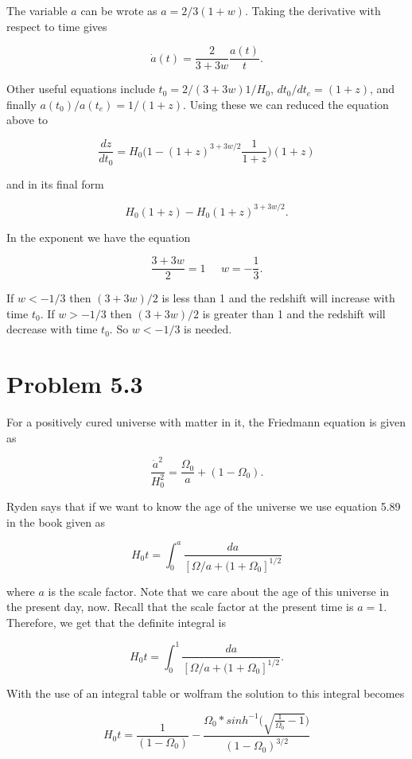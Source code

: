 \documentclass[12pt]{article}
\begin{document}
The variable $a$ can be wrote as $a = 2/3(1 + w)$. Taking the derivative with respect to time gives 

$$
\dot{a}(t) = \frac{2}{3 + 3w}\frac{a(t)}{t}.
$$

Other useful equations include $t_{0} = 2/(3 + 3w)1/H_{0}$, $dt_{0}/dt_{e} = (1 + z)$, and finally $a(t_{0})/a(t_{e}) = 1/(1 + z)$. Using these we can reduced the equation above to 

$$
\frac{dz}{dt_{0}} = H_{0}\Big(1 - (1+z)^{3+3w/2}\frac{1}{1+z}\Big)(1+z)
$$

and in its final form

$$
H_{0}(1+z) - H_{0}(1+z)^{3+3w/2}.
$$

In the exponent we have the equation 

$$
\frac{3 + 3w}{2} = 1 \; \; \; \; \;  w = -\frac{1}{3}.
$$

If $w < -1/3$ then $ (3 + 3w)/2$ is less than 1 and the redshift will increase with time $t_{0}$. If $w > -1/3$ then $ (3 + 3w)/2$ is greater than 1 and the redshift will decrease with time $t_{0}$. So $w < -1/3$ is needed.

\section*{Problem 5.3}

For a positively cured universe with matter in it, the Friedmann equation is given as

$$
\frac{\dot{a}^{2}}{H^{2}_{0}} = \frac{\Omega_{0}}{a} + (1 - \Omega_{0}).
$$

Ryden says that if we want to know the age of the universe we use equation 5.89 in the book given as

$$
H_{0}t = \int_{0}^{a}\frac{da}{[\Omega/a + (1 + \Omega_{0}]^{1/2}}
$$

where $a$ is the scale factor. Note that we care about the age of this universe in the present day, now. Recall that the scale factor at the present time is $a = 1$. Therefore, we get that the definite integral is 

$$
H_{0}t = \int_{0}^{1}\frac{da}{[\Omega/a + (1 + \Omega_{0}]^{1/2}}.
$$

With the use of an integral table or wolfram the solution to this integral becomes

$$
H_{0}t = \frac{1}{(1 - \Omega_{0})} - \frac{\Omega_{0} * sinh^{-1}\Big(\sqrt{\frac{1}{\Omega_{0}} - 1}\Big)}{(1 - \Omega_{0})^{3/2}}
$$ 
\end{document}

